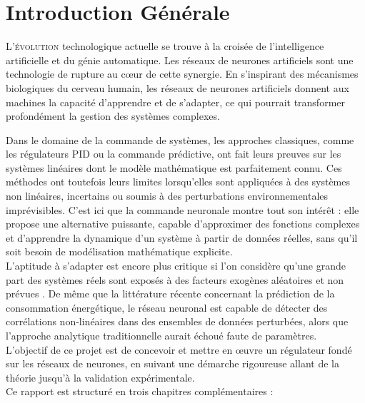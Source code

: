 \chapter*{Introduction Générale}

\lettrine[lines=3]{L}{’évolution} technologique actuelle se trouve à la croisée de l’intelligence artificielle et du génie automatique. Les réseaux de neurones artificiels sont une technologie de rupture au cœur de cette synergie. En s’inspirant des mécanismes biologiques du cerveau humain, les réseaux de neurones artificiels donnent aux machines la capacité d’apprendre et de s’adapter, ce qui pourrait transformer profondément la gestion des systèmes complexes.

Dans le domaine de la commande de systèmes, les approches classiques, comme les régulateurs PID ou la commande prédictive, ont fait leurs preuves sur les systèmes linéaires dont le modèle mathématique est parfaitement connu. Ces méthodes ont toutefois leurs limites lorsqu'elles sont appliquées à des systèmes non linéaires, incertains ou soumis à des perturbations environnementales imprévisibles. C’est ici que la commande neuronale montre tout son intérêt : elle propose une alternative puissante, capable d’approximer des fonctions complexes et d’apprendre la dynamique d’un système à partir de données réelles, sans qu’il soit besoin de modélisation mathématique explicite.\\

L'aptitude à s'adapter est encore plus critique si l'on considère qu'une grande part des systèmes réels sont exposés à des facteurs exogènes aléatoires et non prévues . De même que la littérature récente concernant la prédiction de la consommation énergétique, le réseau neuronal est capable de détecter des corrélations non-linéaires dans des ensembles de données perturbées, alors que l'approche analytique traditionnelle aurait échoué faute de paramètres.\\

L’objectif de ce projet est de concevoir et mettre en œuvre un régulateur fondé sur les réseaux de neurones, en suivant une démarche rigoureuse allant de la théorie jusqu’à la validation expérimentale.\\
 Ce rapport est structuré en trois chapitres complémentaires :

